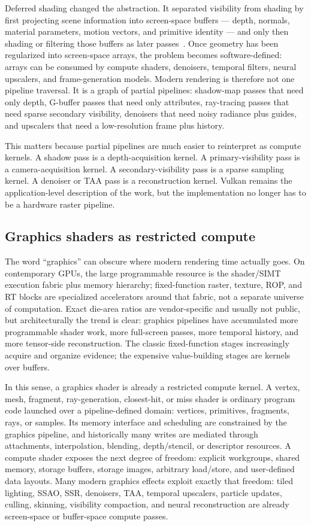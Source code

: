 \documentclass[10pt,journal,onecolumn]{IEEEtran}
\begin{document}
Deferred shading changed the abstraction. It separated visibility from
shading by first projecting scene information into screen-space buffers
--- depth, normals, material parameters, motion vectors, and primitive
identity --- and only then shading or filtering those buffers as later
passes~\cite{akenine2018}. Once geometry has been regularized into
screen-space arrays, the problem becomes software-defined: arrays can
be consumed by compute shaders, denoisers, temporal filters, neural
upscalers, and frame-generation models. Modern rendering is therefore
not one pipeline traversal. It is a graph of partial pipelines:
shadow-map passes that need only depth, G-buffer passes that need only
attributes, ray-tracing passes that need sparse secondary visibility,
denoisers that need noisy radiance plus guides, and upscalers that need
a low-resolution frame plus history.

This matters because partial pipelines are much easier to reinterpret
as compute kernels. A shadow pass is a depth-acquisition kernel. A
primary-visibility pass is a camera-acquisition kernel. A
secondary-visibility pass is a sparse sampling kernel. A denoiser or TAA
pass is a reconstruction kernel. Vulkan remains the application-level
description of the work, but the implementation no longer has to be a
hardware raster pipeline.

\subsection{Graphics shaders as restricted compute}

The word ``graphics'' can obscure where modern rendering time actually goes.
On contemporary GPUs, the large programmable resource is the shader/SIMT
execution fabric plus memory hierarchy; fixed-function raster, texture, ROP,
and RT blocks are specialized accelerators around that fabric, not a separate
universe of computation. Exact die-area ratios are vendor-specific and usually
not public, but architecturally the trend is clear: graphics pipelines have
accumulated more programmable shader work, more full-screen passes, more
temporal history, and more tensor-side reconstruction. The classic
fixed-function stages increasingly acquire and organize evidence; the expensive
value-building stages are kernels over buffers.

In this sense, a graphics shader is already a restricted compute kernel. A
vertex, mesh, fragment, ray-generation, closest-hit, or miss shader is ordinary
program code launched over a pipeline-defined domain: vertices, primitives,
fragments, rays, or samples. Its memory interface and scheduling are constrained
by the graphics pipeline, and historically many writes are mediated through
attachments, interpolation, blending, depth/stencil, or descriptor resources.
A compute shader exposes the next degree of freedom: explicit workgroups,
shared memory, storage buffers, storage images, arbitrary load/store, and
user-defined data layouts. Many modern graphics effects exploit exactly that
freedom: tiled lighting, SSAO, SSR, denoisers, TAA, temporal upscalers, particle
updates, culling, skinning, visibility compaction, and neural reconstruction
are already screen-space or buffer-space compute passes.
\end{document}
